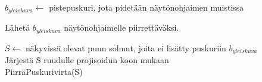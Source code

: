 \perusalgoritmi


$b_{yleiskuva} \gets$ pistepuskuri, jota pidetään näytönohjaimen muistissa


Lähetä $b_{yleiskuva}$ näytönohjaimelle piirrettäväksi.

$S \gets$ näkyvissä olevat puun solmut, joita ei lisätty puskuriin $b_{yleiskuva}$\\
Järjestä S ruudulle projisoidun koon mukaan\\
PiirräPuskurivirta(S)